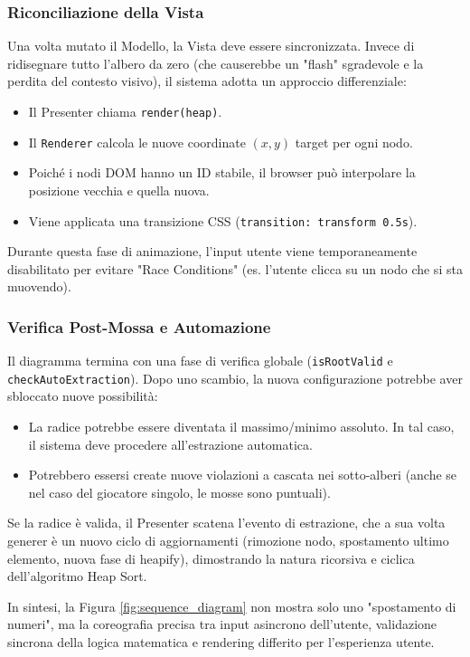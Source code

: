 \documentclass[openany]{theme/uniprthesis}
\begin{document}
\subsubsection{Riconciliazione della Vista}
Una volta mutato il Modello, la Vista deve essere sincronizzata.
Invece di ridisegnare tutto l'albero da zero (che causerebbe un "flash" sgradevole e la perdita del contesto visivo), il sistema adotta un approccio differenziale:
\begin{itemize}
    \item Il Presenter chiama \texttt{render(heap)}.
    \item Il \texttt{Renderer} calcola le nuove coordinate $(x, y)$ target per ogni nodo.
    \item Poiché i nodi DOM hanno un ID stabile, il browser può interpolare la posizione vecchia e quella nuova.
    \item Viene applicata una transizione CSS (\texttt{transition: transform 0.5s}).
\end{itemize}
Durante questa fase di animazione, l'input utente viene temporaneamente disabilitato per evitare "Race Conditions" (es. l'utente clicca su un nodo che si sta muovendo).

\subsubsection{Verifica Post-Mossa e Automazione}
Il diagramma termina con una fase di verifica globale (\texttt{isRootValid} e \texttt{checkAutoExtraction}).
Dopo uno scambio, la nuova configurazione potrebbe aver sbloccato nuove possibilità:
\begin{itemize}
    \item La radice potrebbe essere diventata il massimo/minimo assoluto. In tal caso, il sistema deve procedere all'estrazione automatica.
    \item Potrebbero essersi create nuove violazioni a cascata nei sotto-alberi (anche se nel caso del giocatore singolo, le mosse sono puntuali).
\end{itemize}
Se la radice è valida, il Presenter scatena l'evento di estrazione, che a sua volta generer è un nuovo ciclo di aggiornamenti (rimozione nodo, spostamento ultimo elemento, nuova fase di heapify), dimostrando la natura ricorsiva e ciclica dell'algoritmo Heap Sort.

In sintesi, la Figura \ref{fig:sequence_diagram} non mostra solo uno "spostamento di numeri", ma la coreografia precisa tra input asincrono dell'utente, validazione sincrona della logica matematica e rendering differito per l'esperienza utente.
\end{document}
